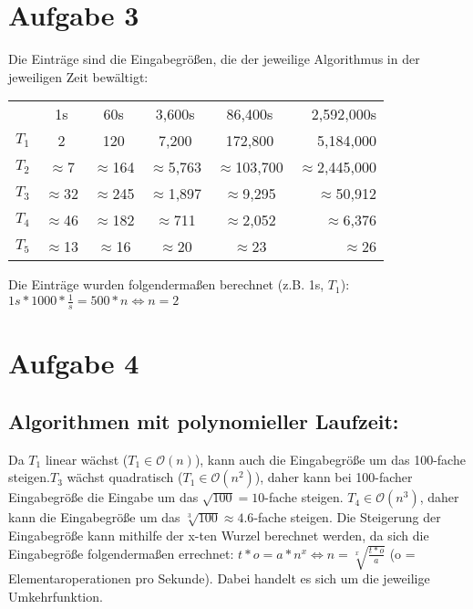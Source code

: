 \documentclass[a4paper,10pt]{article}
\begin{document}
\section{Aufgabe 3}
Die Einträge sind die Eingabegrößen, die der jeweilige Algorithmus in der jeweiligen Zeit bewältigt:\newline
 \begin{tabular}{lccccr}
   & 1s & 60s & 3,600s & 86,400s & 2,592,000s \\
  $T_1$ & 2 &120 &	7,200 &	172,800 &5,184,000 \\
  $T_2$&$\approx$7&$\approx$164&$\approx$5,763&$\approx$103,700 &$\approx$2,445,000\\
  $T_3$&$\approx$32&$\approx$245&$\approx$1,897&$\approx$9,295&$\approx$50,912\\
  $T_4$&$\approx$46&$\approx$182&$\approx$711&$\approx$2,052&$\approx$6,376\\
  $T_5$&$\approx$13&$\approx$16&$\approx$20&$\approx$23&$\approx$26\\
 \end{tabular}
\newline Die Einträge wurden folgendermaßen berechnet (z.B. 1s, $T_1$):\newline
$1s * 1000* \frac{1}{s} = 500 * n \Leftrightarrow n = 2$

\section{Aufgabe 4}
\subsection{Algorithmen mit polynomieller Laufzeit:}
Da $T_1$ linear wächst ($T_1 \in \mathcal{O}(n)$), kann auch die Eingabegröße um das 100-fache steigen.\newline $T_3$ wächst quadratisch
($T_1 \in \mathcal{O}(n^2)$), daher kann bei 100-facher Eingabegröße die Eingabe um das $\sqrt{100} = 10$-fache steigen. \newline $T_4 \in \mathcal{O}(n^3)$,
daher kann die Eingabegröße um das $\sqrt[3]{100} \approx 4.6$-fache steigen.\newline
Die Steigerung der Eingabegröße kann mithilfe der x-ten Wurzel berechnet werden, da sich die Eingabegröße folgendermaßen errechnet:\newline
$t*o = a*n^x \Leftrightarrow n = \sqrt[x]{\frac{t*o}{a}}$ (o = Elementaroperationen pro Sekunde). Dabei handelt es sich um die jeweilige
Umkehrfunktion.
\end{document}
